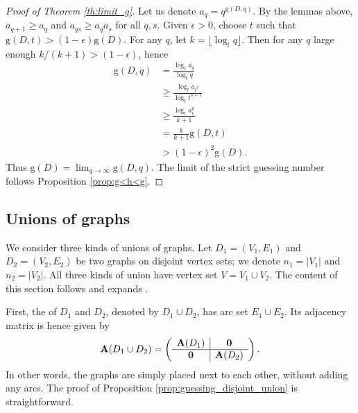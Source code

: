 \documentclass[a4paper, 11pt]{book}
\numberwithin{equation}{section}
\theoremstyle{plain}
\newcommand{\adjacency}{{\bf A}}
\newcommand{\guessing}{\mathrm{g}}
\renewcommand{\(}{\ldbrack}
\renewcommand{\)}{\rdbrack}
\newcommand{\BF}[1]{{\bf\boldmath{#1}\unboldmath}}
\begin{document}
\begin{proof}[Proof of Theorem \ref{th:limit_g}]
Let us denote $a_q = q^{\guessing(D,q)}$. By the lemmas above, $a_{q+1} \ge a_q$ and $a_{qs} \ge a_q a_s$ for all $q,s$. Given $\epsilon > 0$, choose $t$ such that $\guessing(D, t) > (1- \epsilon) \guessing(D)$. For any $q$, let $k = \lfloor \log_t q \rfloor$. Then for any $q$ large enough $k / (k+1) > (1 - \epsilon)$, hence
\begin{align*}
	\guessing(D,q) &= \frac{\log_t a_q}{\log_t q}\\
	&\ge \frac{\log_t a_{t^k}}{\log_t t^{k+1}}\\
	&\ge \frac{\log_t a_t^k}{k+1}\\
	&= \frac{k}{k+1} \guessing(D, t)\\
	&> (1-\epsilon)^2 \guessing(D).
\end{align*}
Thus $\guessing(D) = \lim_{q \to \infty} \guessing(D,q)$. The limit of the strict guessing number follows Proposition \ref{prop:g<h<g}.
\end{proof}
















\subsection{Unions of graphs} \label{sec:guessing_union}

We consider three kinds of unions of graphs. Let $D_1 = (V_1 ,E_1)$ and $D_2 = (V_2, E_2)$ be two graphs on disjoint vertex sets; we denote $n_1 = |V_1|$ and $n_2 = |V_2|$. All three kinds of union have vertex set $V = V_1 \cup V_2$. The content of this section follows and expands \cite{GR11}.

First, the \BF{disjoint union} \label{union of graphs!disjoint} of $D_1$ and $D_2$, denoted by $D_1 \cup D_2$, has arc set $E_1 \cup E_2$. Its adjacency matrix is hence given by
\begin{equation} \nonumber
	\adjacency(D_1 \cup D_2) = \left(\begin{array}{c|c}
	\adjacency(D_1) & {\bf 0}\\
	\hline
	{\bf 0} & \adjacency(D_2)
	\end{array}\right).
\end{equation}
In other words, the graphs are simply placed next to each other, without adding any arcs. The proof of Proposition \ref{prop:guessing_disjoint_union} is straightforward.
\end{document}

